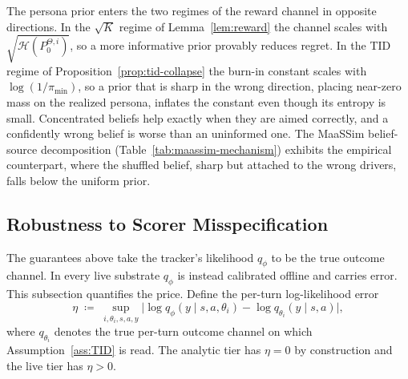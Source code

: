 \begin{remark}
\label{rem:prior-double-edged}
The persona prior enters the two regimes of the reward channel in opposite directions. In the $\sqrt K$ regime of Lemma~\ref{lem:reward} the channel scales with $\sqrt{\mathcal H(P_0^{\Theta,i})}$, so a more informative prior provably reduces regret. In the TID regime of Proposition~\ref{prop:tid-collapse} the burn-in constant scales with $\log(1/\pi_{\min})$, so a prior that is sharp in the wrong direction, placing near-zero mass on the realized persona, inflates the constant even though its entropy is small. Concentrated beliefs help exactly when they are aimed correctly, and a confidently wrong belief is worse than an uninformed one. The MaaSSim belief-source decomposition (Table~\ref{tab:maassim-mechanism}) exhibits the empirical counterpart, where the shuffled belief, sharp but attached to the wrong drivers, falls below the uniform prior.
\end{remark}

\subsection{Robustness to Scorer Misspecification}
\label{app:misspec}

The guarantees above take the tracker's likelihood $q_\phi$ to be the true outcome channel. In every live substrate $q_\phi$ is instead calibrated offline and carries error. This subsection quantifies the price. Define the per-turn log-likelihood error
\begin{equation}\label{eq:eta-def}
\eta \;\coloneqq\; \sup_{i,\theta_i,s,a,y}\big|\log q_\phi(y\mid s,a,\theta_i)-\log q_{\theta_i}(y\mid s,a)\big|,
\end{equation}
where $q_{\theta_i}$ denotes the true per-turn outcome channel on which Assumption~\ref{ass:TID} is read. The analytic tier has $\eta=0$ by construction and the live tier has $\eta>0$.

